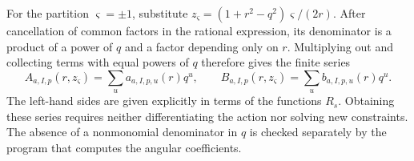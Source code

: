 \documentclass[11pt,a4paper]{article}
\begin{document}
For the partition $\varsigma=\pm1$, substitute $z_\varsigma=(1+r^2-q^2)\varsigma/(2r)$. After cancellation of common factors in the rational expression, its denominator is a product of a power of $q$ and a factor depending only on $r$. Multiplying out and collecting terms with equal powers of $q$ therefore gives the finite series
\begin{equation}
 A_{a,I,p}(r,z_\varsigma)=\sum_u a_{a,I,p,u}(r)q^u,\qquad
 B_{a,I,p}(r,z_\varsigma)=\sum_u b_{a,I,p,u}(r)q^u.
\label{eq:cat-angular-source-transfer}
\end{equation}
The left-hand sides are given explicitly in terms of the functions $R_s$. Obtaining these series requires neither differentiating the action nor solving new constraints. The absence of a nonmonomial denominator in $q$ is checked separately by the program that computes the angular coefficients.
\end{document}
